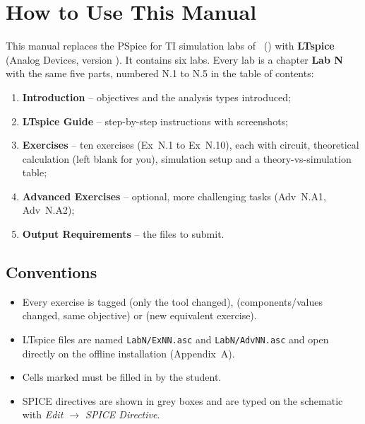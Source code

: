 \chapter*{How to Use This Manual}

This manual replaces the PSpice for TI simulation labs of \courseNameEN\ (\courseCode) with
\textbf{LTspice} (Analog Devices, version \ltspiceVersion). It contains six labs.
Every lab is a chapter \textbf{Lab N} with the same five parts, numbered N.1 to N.5 in the table of contents:
\begin{enumerate}[itemsep=2pt]
  \item \textbf{Introduction} -- objectives and the analysis types introduced;
  \item \textbf{LTspice Guide} -- step-by-step instructions with screenshots;
  \item \textbf{Exercises} -- ten exercises (Ex~N.1 to Ex~N.10), each with circuit, theoretical calculation (left blank for you), simulation setup and a theory-vs-simulation table;
  \item \textbf{Advanced Exercises} -- optional, more challenging tasks (Adv~N.A1, Adv~N.A2);
  \item \textbf{Output Requirements} -- the files to submit.
\end{enumerate}

\section*{Conventions}
\begin{itemize}[itemsep=2pt]
  \item Every exercise is tagged  (only the tool changed),  (components/values changed, same objective) or  (new equivalent exercise).
  \item LTspice files are named \texttt{LabN/ExNN.asc} and \texttt{LabN/AdvNN.asc} and open directly on the offline installation (Appendix~A).
  \item Cells marked \fillcell{} must be filled in by the student.
  \item SPICE directives are shown in grey boxes and are typed on the schematic with \textit{Edit $\rightarrow$ SPICE Directive}.
\end{itemize}
